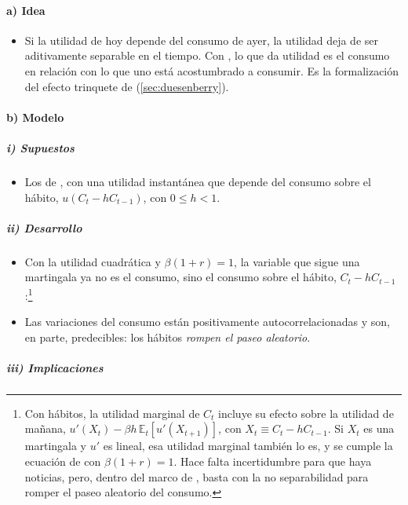 \documentclass[11pt]{article}
\begin{document}
\paragraph{a) Idea}

\begin{itemize}
\item Si la utilidad de hoy depende del consumo de ayer, la utilidad deja de ser aditivamente separable en el tiempo. Con , lo que da utilidad es el consumo en relación con lo que uno está acostumbrado a consumir. Es la formalización del efecto trinquete de  (\ref{sec:duesenberry}).
\end{itemize}

\paragraph{b) Modelo}

\subparagraph{i) Supuestos}

\begin{itemize}
\item Los de , con una utilidad instantánea que depende del consumo sobre el hábito, $u(C_t-hC_{t-1})$, con $0\leq h<1$.
\end{itemize}

\subparagraph{ii) Desarrollo}

\begin{itemize}
\item Con la utilidad cuadrática y $\beta(1+r)=1$, la variable que sigue una martingala ya no es el consumo, sino el consumo sobre el hábito, $C_t-hC_{t-1}$:\footnote{Con hábitos, la utilidad marginal de $C_t$ incluye su efecto sobre la utilidad de mañana, $u'(X_t)-\beta h\,\mathbb{E}_t[u'(X_{t+1})]$, con $X_t\equiv C_t-hC_{t-1}$. Si $X_t$ es una martingala y $u'$ es lineal, esa utilidad marginal también lo es, y se cumple la ecuación de  con $\beta(1+r)=1$. Hace falta incertidumbre para que haya noticias, pero, dentro del marco de , basta con la no separabilidad para romper el paseo aleatorio del consumo.}
\item Las variaciones del consumo están positivamente autocorrelacionadas y son, en parte, predecibles: los hábitos \emph{rompen el paseo aleatorio}.
\end{itemize}

\subparagraph{iii) Implicaciones}
\end{document}
